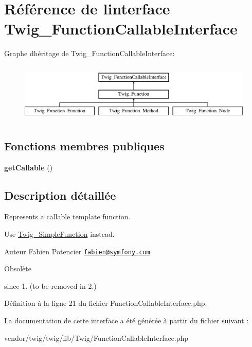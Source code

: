 \hypertarget{interface_twig___function_callable_interface}{}\section{Référence de l\textquotesingle{}interface Twig\+\_\+\+Function\+Callable\+Interface}
\label{interface_twig___function_callable_interface}
Graphe d\textquotesingle{}héritage de Twig\+\_\+\+Function\+Callable\+Interface\+:\begin{figure}[H]
\begin{center}
\leavevmode
\includegraphics[height=2.828283cm]{interface_twig___function_callable_interface}
\end{center}
\end{figure}
\subsection*{Fonctions membres publiques}
\begin{DoxyCompactItemize}
\item 
{\bfseries get\+Callable} ()\hypertarget{interface_twig___function_callable_interface_a0be839e0782a38a172c386bd963375c9}{}\label{interface_twig___function_callable_interface_a0be839e0782a38a172c386bd963375c9}

\end{DoxyCompactItemize}


\subsection{Description détaillée}
Represents a callable template function.

Use \hyperlink{class_twig___simple_function}{Twig\+\_\+\+Simple\+Function} instead.

\begin{DoxyAuthor}{Auteur}
Fabien Potencier \href{mailto:fabien@symfony.com}{\tt fabien@symfony.\+com}
\end{DoxyAuthor}
\begin{DoxyRefDesc}{Obsolète}
\item[\hyperlink{deprecated__deprecated000027}{Obsolète}]since 1. (to be removed in 2.) \end{DoxyRefDesc}


Définition à la ligne 21 du fichier Function\+Callable\+Interface.\+php.



La documentation de cette interface a été générée à partir du fichier suivant \+:\begin{DoxyCompactItemize}
\item 
vendor/twig/twig/lib/\+Twig/Function\+Callable\+Interface.\+php\end{DoxyCompactItemize}

